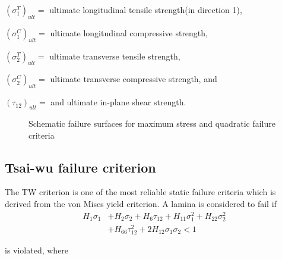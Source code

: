 $(\sigma _1^{T})_{ult}= $ ultimate longitudinal tensile strength(in direction 1),

$(\sigma _1^{C})_{ult}= $ ultimate longitudinal compressive strength,

$(\sigma _2^{T})_{ult}= $ ultimate transverse tensile strength,

$(\sigma _2^{C})_{ult}= $ ultimate transverse compressive strength, and

$(\tau_{12})_{ult}= $ and ultimate in-plane shear strength.

\begin{figure}
\centering
{}
\caption{Schematic failure surfaces for maximum stress and quadratic failure
criteria}
\end{figure}


\subsection{Tsai-wu failure criterion}
The TW criterion is one of the most reliable static failure criteria which is derived from the von
Mises yield criterion.  
A lamina is considered to fail
if \begin{equation} \label{eq:tsai_wu}
\begin{split}
	H_1 \sigma_1  & + H_2 \sigma_2 + H_6 \tau_{12} + H_{11}\sigma_1^2 + H_{22} \sigma_2^2 \\
				  & + H_{66}  \tau_{12}^2 + 2H_{12}\sigma_1\sigma_2 < 1
\end{split}
\end{equation}

is violated, where

